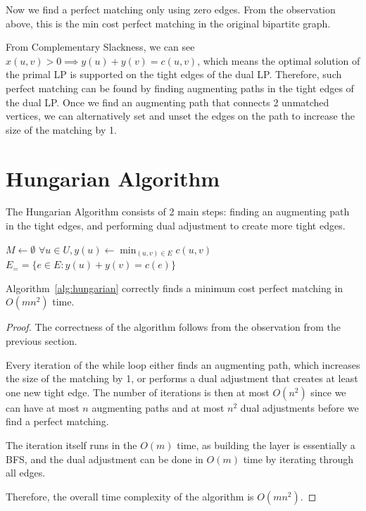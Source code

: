 Now we find a perfect matching only using zero edges. From the observation above, this is the min cost perfect matching in the original bipartite graph.

From Complementary Slackness, we can see $x(u,v) > 0 \implies y(u) + y(v) = c(u,v)$, which means the optimal solution of the primal LP is supported on the tight edges of the dual LP.
Therefore, such perfect matching can be found by finding augmenting paths in the tight edges of the dual LP. Once we find an augmenting path that connects 2 unmatched vertices, we can alternatively set and unset the edges on the path to increase the size of the matching by 1.

\section{Hungarian Algorithm}

The Hungarian Algorithm consists of 2 main steps: finding an augmenting path in the tight edges, and performing dual adjustment to create more tight edges.

\begin{algorithm}[H]
	\caption{Hungarian Algorithm} \label{alg:hungarian}
	$M \gets \emptyset$\;
	$\forall u \in U, y(u) \gets \min_{(u,v)\in E} c(u,v)$\;
	$E_= = \{ e \in E : y(u) + y(v) = c(e) \}$\;
\end{algorithm}
\begin{theorem}
	Algorithm~\ref{alg:hungarian} correctly finds a minimum cost perfect matching in \( O(mn^2) \) time.
\end{theorem}
\begin{proof}
	The correctness of the algorithm follows from the observation from the previous section.

	Every iteration of the while loop either finds an augmenting path, which increases the size of the matching by 1, or performs a dual adjustment that creates at least one new tight edge. The number of iterations is then at most \( O(n^2) \) since we can have at most \( n \) augmenting paths and at most \( n^2 \) dual adjustments before we find a perfect matching.

	The iteration itself runs in the $O(m)$ time, as building the layer is essentially a BFS, and the dual adjustment can be done in $O(m)$ time by iterating through all edges.

	Therefore, the overall time complexity of the algorithm is \( O(mn^2) \).
\end{proof}

